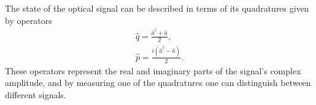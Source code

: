 \documentclass[a4paper]{article}
\begin{document}
 
The state of the optical signal can be described in terms of its quadratures given by operators
\begin{equation}
\begin{gathered}
    \hat{q} = \frac{\hat{a}^{\dagger} + \hat{a}}{2},\\
    \hat{p} = \frac{i(\hat{a}^{\dagger} - \hat{a})}{2}.
\end{gathered}
\end{equation}
These operators represent the real and imaginary parts of the signal's complex amplitude, and by measuring one of the quadratures one can distinguish between different signals.
\end{document}

